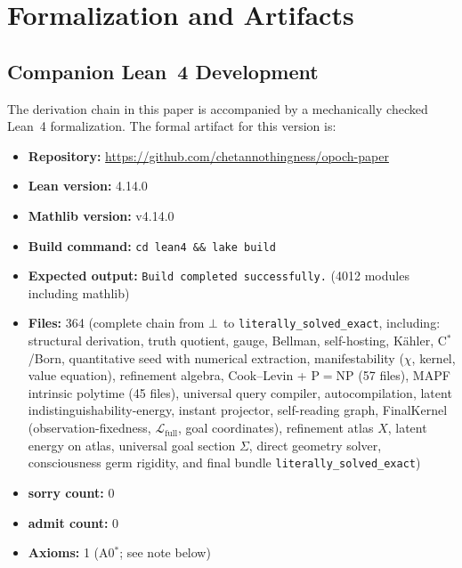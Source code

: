 
\section{Formalization and Artifacts}
\label{app:formalization}

\subsection{Companion Lean~4 Development}

The derivation chain in this paper is accompanied by a mechanically
checked Lean~4 formalization.  The formal artifact for this version is:

\begin{itemize}[nosep]
  \item \textbf{Repository:}
        \url{https://github.com/chetannothingness/opoch-paper}
  \item \textbf{Lean version:} 4.14.0
  \item \textbf{Mathlib version:} v4.14.0
  \item \textbf{Build command:} \texttt{cd lean4 \&\& lake build}
  \item \textbf{Expected output:} \texttt{Build completed successfully.}
        (4012 modules including mathlib)
  \item \textbf{Files:} 364 (complete chain from $\bot$ to
        \texttt{literally\_solved\_exact}, including: structural derivation,
        truth quotient, gauge, Bellman, self-hosting, K\"{a}hler, C$^*$/Born,
        quantitative seed with numerical extraction, manifestability
        ($\chi$, kernel, value equation), refinement algebra, Cook--Levin
        + P$=$NP (57 files), MAPF intrinsic polytime (45 files),
        universal query compiler, autocompilation, latent
        indistinguishability-energy, instant projector, self-reading graph,
        FinalKernel (observation-fixedness, $\mathcal{L}_{\mathrm{full}}$,
        goal coordinates), refinement atlas $X$, latent energy on atlas,
        universal goal section $\Sigma$, direct geometry solver,
        consciousness germ rigidity, and final bundle
        \texttt{literally\_solved\_exact})
  \item \textbf{sorry count:} 0
  \item \textbf{admit count:} 0
  \item \textbf{Axioms:} 1 (A0$^*$; see note below)
\end{itemize}

